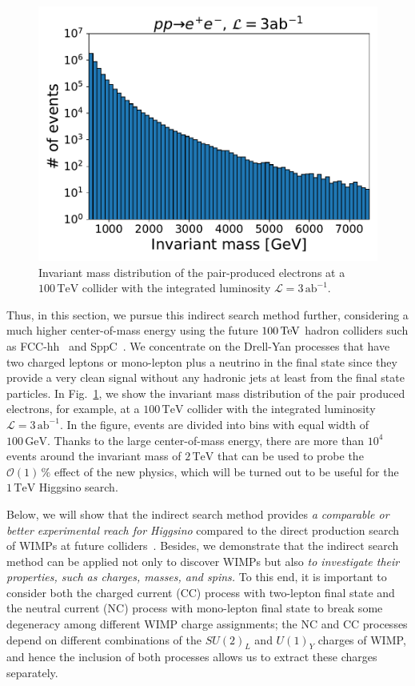 \documentclass[12pt,twoside,book]{article}
\begin{document}
\begin{figure}[t]
  \centering
  \includegraphics[width=0.5\hsize]{histMee.pdf}
  \caption{
    Invariant mass distribution of the pair-produced electrons at a $100\,\mathrm{TeV}$ collider with the integrated luminosity $\mathcal{L} = 3\,\mathrm{ab}^{-1}$.
  }
  \label{fig:histMee}
\end{figure}

Thus, in this section, we pursue this indirect search method further, considering a much higher center-of-mass energy using the future $100\,{\rm TeV}$ hadron colliders such as FCC-hh~\cite{Mangano:2016jyj, Contino:2016spe, Golling:2016gvc, Benedikt:2651300} and SppC~\cite{CEPC-SPPCStudyGroup:2015csa, CEPC-SPPCStudyGroup:2015esa}.
We concentrate on the Drell-Yan processes that have two charged leptons or mono-lepton plus a neutrino in the final state since they provide a very clean signal without any hadronic jets at least from the final state particles.
In Fig.~\ref{fig:histMee}, we show the invariant mass distribution of the pair produced electrons, for example, at a $100\,\mathrm{TeV}$ collider with the integrated luminosity $\mathcal{L} = 3\,\mathrm{ab}^{-1}$.
In the figure, events are divided into bins with equal width of $100\,\mathrm{GeV}$.
Thanks to the large center-of-mass energy, there are more than $10^4$ events around the invariant mass of $2\,\mathrm{TeV}$ that can be used to probe the $\mathcal{O}(1)\,\%$ effect of the new physics, which will be turned out to be useful for the $1\,\mathrm{TeV}$ Higgsino search.

Below, we will show that the indirect search method provides \textit{a comparable or better experimental reach for Higgsino} compared to the direct production search of WIMPs at future colliders~\cite{Low:2014cba, Cirelli:2014dsa, Han:2018wus, Mahbubani:2017gjh}.
Besides, we demonstrate that the indirect search method can be applied not only to discover WIMPs but also \textit{to investigate their properties, such as charges, masses, and spins.}
To this end, it is important to consider both the charged current (CC) process with two-lepton final state and the neutral current (NC) process with mono-lepton final state to break some degeneracy among different WIMP charge assignments; the NC and CC processes depend on different combinations of the $SU(2)_L$ and $U(1)_Y$ charges of WIMP, and hence the inclusion of both processes allows us to extract these charges separately.
\end{document}
